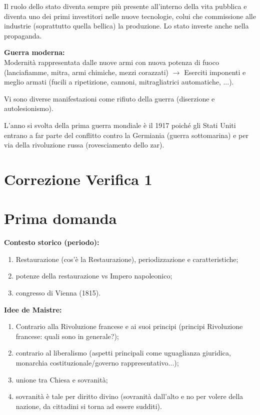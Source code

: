 \documentclass[a4paper]{article}
\begin{document}
Il ruolo dello stato diventa sempre più presente
all'interno della vita pubblica e diventa uno dei primi investitori
nelle nuove tecnologie, colui che commissione alle industrie (soprattutto quella bellica)
la produzione.
Lo stato investe anche nella propaganda.

\textbf{Guerra moderna:} \\
Modernità rappresentata dalle nuove armi con nuova potenza di fuoco
(lanciafiamme, mitra, armi chimiche, mezzi corazzati)
\(\rightarrow\) Eserciti imponenti e meglio armati (fucili a ripetizione, cannoni, mitragliatrici automatiche, ...).

Vi sono diverse manifestazioni come rifiuto della guerra (diserzione e autolesionismo).



L'anno si svolta della prima guerra mondiale è il 1917 poiché
gli Stati Uniti entrano a far parte del conflitto contro la Germiania (guerra sottomarina)
e per via della rivoluzione russa (rovesciamento dello zar).

\pagebreak

\section{Correzione Verifica 1}

\section{Prima domanda}

\textbf{Contesto storico (periodo):}
\begin{enumerate}
    \item Restaurazione (cos'è la Restaurazione), periodizzazione e caratteristiche;
    \item potenze della restaurazione vs Impero napoleonico;
    \item congresso di Vienna (1815).
\end{enumerate}

\textbf{Idee de Maistre:}
\begin{enumerate}
    \item Contrario alla Rivoluzione francese e ai suoi principi (principi Rivoluzione francese: quali sono in generale?);
    \item contrario al liberalismo (aspetti principali come uguaglianza giuridica, monarchia costituzionale/governo rappresentativo...);
    \item unione tra Chiesa e sovranità;
    \item sovranità è tale per diritto divino (sovranità dall'alto e no per volere della nazione, da cittadini si torna ad essere sudditi).
\end{enumerate}
\end{document}
